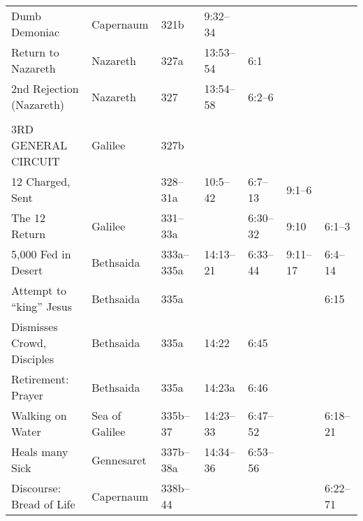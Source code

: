 \begin{longtable}[h]{l@{\hspace{0.5em}}l@{\hspace{0.5em}}l@{\hspace{0.5em}}BBBB}
\quad Dumb Demoniac                        & Capernaum           & 321b               & 9:32--34          &                    &                       & \\
Return to Nazareth                         & Nazareth            & 327a               & 13:53--54         & 6:1                &                       & \\
2nd Rejection (Nazareth)                   & Nazareth            & 327                & 13:54--58         & 6:2--6             &                       & \\
\\
3RD GENERAL CIRCUIT                        & Galilee             & 327b               &                   &                    &                       & \\
12 Charged, Sent                           &                     & 328--31a           & 10:5--42          & 6:7--13            & 9:1--6                & \\
The 12 Return                              & Galilee             & 331--33a           &                   & 6:30--32           & 9:10                  & 6:1--3 \\
5,000 Fed in Desert                        & Bethsaida           & 333a--335a         & 14:13--21         & 6:33--44           & 9:11--17              & 6:4--14 \\
\quad Attempt to ``king'' Jesus            & Bethsaida           & 335a               &                   &                    &                       & 6:15 \\
\quad Dismisses Crowd, Disciples           & Bethsaida           & 335a               & 14:22             & 6:45               &                       & \\
\quad Retirement: Prayer                   & Bethsaida           & 335a               & 14:23a            & 6:46               &                       & \\
Walking on Water                           & Sea of Galilee      & 335b--37           & 14:23--33         & 6:47--52           &                       & 6:18--21 \\
Heals many Sick                            & Gennesaret          & 337b--38a          & 14:34--36         & 6:53--56           &                       & \\
Discourse: Bread of Life                   & Capernaum           & 338b--44           &                   &                    &                       & 6:22--71 \\

\end{longtable}
